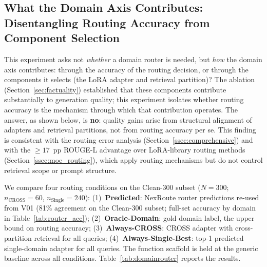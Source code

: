 \documentclass[a4paper,fleql,doubleblind]{cas-sc}
\begin{document}
\subsection{What the Domain Axis Contributes: Disentangling Routing Accuracy from Component Selection}
\label{ssec:domainrouter}
This experiment asks not \emph{whether} a domain router is needed, but
\emph{how} the domain axis contributes: through the accuracy of the routing
decision, or through the components it selects (the LoRA adapter and retrieval
partition)?
The ablation (Section~\ref{sec:factuality}) established that these components
contribute substantially to generation quality; this experiment isolates
whether routing accuracy is the mechanism through which that contribution
operates.
The answer, as shown below, is \textbf{no}: quality gains arise from structural
alignment of adapters and retrieval partitions, not from routing accuracy per se.
This finding is consistent with the routing error analysis (Section~\ref{ssec:comprehensive})
and with the ${\geq}17$~pp ROUGE-L advantage over LoRA-library routing methods
(Section~\ref{ssec:moe_routing}), which apply routing mechanisms but do not
control retrieval scope or prompt structure.

We compare four routing conditions on the Clean-300 subset
($N{=}300$; $n_{\text{CROSS}}{=}60$, $n_{\text{Single}}{=}240$):
(1)~\textbf{Predicted}: NexRoute router predictions re-used from V01 (81\% agreement
on the Clean-300 subset; full-set accuracy by domain in Table~\ref{tab:router_acc});
(2)~\textbf{Oracle-Domain}: gold domain label, the upper bound on routing accuracy;
(3)~\textbf{Always-CROSS}: CROSS adapter with cross-partition retrieval for all queries;
(4)~\textbf{Always-Single-Best}: top-1 predicted single-domain adapter for all queries.
The function scaffold is held at the generic baseline across all conditions.
Table~\ref{tab:domainrouter} reports the results.
\end{document}
